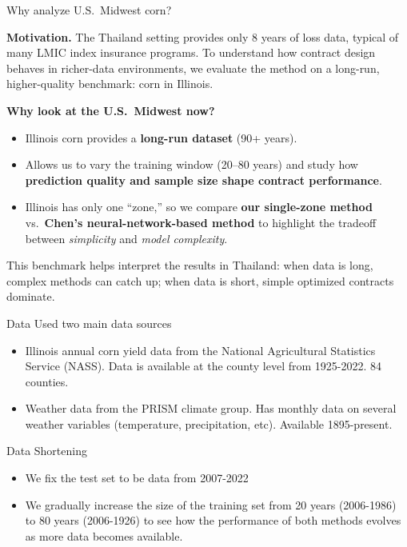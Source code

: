 \documentclass{beamer}
\begin{document}
  \begin{frame}{Why analyze U.S.\ Midwest corn?}
    \small
    
    \textbf{Motivation.}  
  The Thailand setting provides only 8 years of loss data, typical of many LMIC index insurance programs.  
  To understand how contract design behaves in richer-data environments, we evaluate the method on a 
  long-run, higher-quality benchmark: corn in Illinois.
    
    \medskip
    
    \textbf{Why look at the U.S.\ Midwest now?}
    \begin{itemize}\itemsep2pt
        \item Illinois corn provides a \textbf{long-run dataset} (90+ years).
        \item Allows us to vary the training window (20–80 years) and study how  
              \textbf{prediction quality and sample size shape contract performance}.
        \item Illinois has only one “zone,” so we compare  
        \textbf{our single-zone method} vs.\ \textbf{Chen’s neural-network-based method} to highlight  
        the tradeoff between \emph{simplicity} and \emph{model complexity}.
    \end{itemize}
    
    \medskip
    
    {\scriptsize This benchmark helps interpret the results in Thailand: when data is long, complex methods can catch up; when data is short, simple optimized contracts dominate.}
    
    \end{frame}
    

\begin{frame}{Data}
  Used two main data sources
  \begin{itemize}
      \setlength\itemsep{2em}
      \item Illinois annual corn yield data from the National Agricultural Statistics Service (NASS). Data is available at the county level from 1925-2022. 84 counties. 
      \item Weather data from the PRISM climate group. Has monthly data on several weather variables (temperature, precipitation, etc). Available 1895-present.
  \end{itemize}
\end{frame}

\begin{frame}{Data Shortening}
  \begin{itemize}
    \setlength\itemsep{2em}
    \item We fix the test set to be data from 2007-2022
    \item We gradually increase the size of the training set from 20 years (2006-1986) to 80 years (2006-1926) to see how the performance of both methods evolves as more data becomes available. 
\end{itemize}
  
\end{frame}
\end{document}
